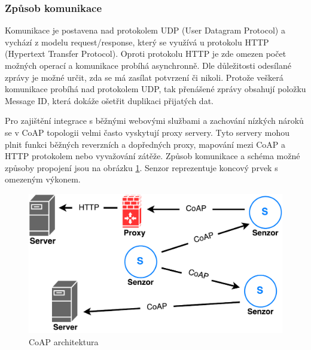    \subsubsection{Způsob komunikace}
   Komunikace je postavena nad protokolem UDP (User Datagram Protocol) a vychází
   z modelu request/response, který se využívá u protokolu HTTP (Hypertext
   Transfer Protocol). Oproti protokolu HTTP je zde omezen počet možných operací
   a komunikace probíhá asynchronně. Dle důležitosti odesílané zprávy je možné určit,
   zda se má zasílat potvrzení či nikoli. Protože veškerá komunikace probíhá nad
   protokolem UDP, tak přenášené zprávy obsahují položku Message ID, která dokáže
   ošetřit duplikaci přijatých dat.
   
   Pro zajištění integrace s běžnými webovými službami a zachování nízkých nároků
   se v CoAP topologii velmi často vyskytují proxy servery. Tyto servery mohou plnit
   funkci běžných reverzních a dopředných proxy, mapování mezi CoAP a HTTP protokolem
   nebo vyvažování zátěže. Způsob komunikace a schéma možné způsoby propojení jsou na
   obrázku \ref{obr.coap-arch}. Senzor reprezentuje koncový prvek s omezeným výkonem.
   
   \begin{figure}[ht]
   \begin{center}
   \includegraphics[scale=0.41]{pictures/coap-arch}
   \caption{CoAP architektura}
   \label{obr.coap-arch}
   \end{center}
   \end{figure}
   
